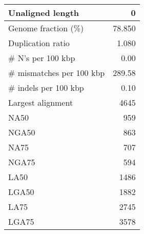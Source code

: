 \documentclass[12pt,a4paper]{article}
\begin{document}
\begin{table}[ht]
\begin{center}
\begin{tabular}{|l*{1}{|r}|}
Unaligned length & 0 \\ \hline
Genome fraction (\%) & 78.850 \\ \hline
Duplication ratio & 1.080 \\ \hline
\# N's per 100 kbp & 0.00 \\ \hline
\# mismatches per 100 kbp & 289.58 \\ \hline
\# indels per 100 kbp & 0.10 \\ \hline
Largest alignment & 4645 \\ \hline
NA50 & 959 \\ \hline
NGA50 & 863 \\ \hline
NA75 & 707 \\ \hline
NGA75 & 594 \\ \hline
LA50 & 1486 \\ \hline
LGA50 & 1882 \\ \hline
LA75 & 2745 \\ \hline
LGA75 & 3578 \\ \hline
\end{tabular}
\end{center}
\end{table}
\end{document}
